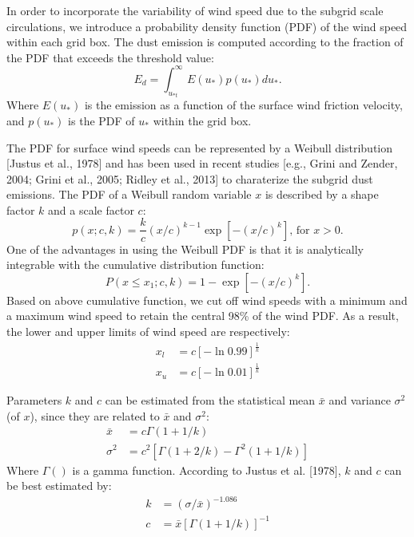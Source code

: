   In order to incorporate the variability of wind speed due to the subgrid scale
  circulations, we introduce a probability density function (PDF) of the wind speed
  within each grid box. The dust emission is computed according to the fraction of 
  the PDF that exceeds the threshold value:
  \begin{equation}
  E_{d} = \int^\infty_{u_{*t}} E(u_*) p(u_*) d u_* \mbox{.}
  \end{equation}
  Where $E(u_*)$ is the emission as a function of the surface wind friction velocity,
  and $p(u_*)$ is the PDF of $u_*$ within the grid box. 

  The PDF for surface wind speeds can be represented by a Weibull distribution 
  [Justus et al., 1978] and has been used in recent studies [e.g., Grini and Zender,
  2004; Grini et al., 2005; Ridley et al., 2013] to charaterize the subgrid dust 
  emissions. The PDF of a Weibull random variable $x$ is described by a shape factor $k$ 
  and a scale factor $c$:
  \begin{equation}
  p(x;c,k) = \frac{k}{c} (x/c )^{k-1}
         \exp{\left[ -(x/c)^k \right]} \mbox{,  for } x>0 \mbox{.} 
  \end{equation}
  One of the advantages in using the Weibull PDF is that it is analytically 
  integrable with the cumulative distribution function:
  \begin{equation}
  P(x \leq x_1;c,k) = 1 - \exp{ \left[ -(x/c)^k\right] } \mbox{.}
  \end{equation} 
  Based on above cumulative function, we cut off wind speeds with a minimum and a 
  maximum wind speed to retain the central 98\% of the wind PDF. As a result, the 
  lower and upper limits of wind speed are respectively:
  \begin{align} 
  x_{l} &= c \left[ -\ln{0.99} \right]^{\frac{1}{k}}  \\
  x_{u} &= c \left[ -\ln{0.01} \right]^{\frac{1}{k}} \label{eq:xu}
  \end{align}

  Parameters $k$ and $c$ can be estimated from the statistical mean $\bar{x}$ and 
  variance $\sigma^2$ (of $x$), since they are related to $\bar{x}$ and $\sigma^2$: 
  \begin{align}
  \bar{x}  &= c \Gamma(1+1/k)  \\
  \sigma^2 &= c^2 \left[ \Gamma(1+2/k) - \Gamma^2(1+1/k) \right]  
  \end{align}
  Where $\Gamma()$ is a gamma function. According to Justus et al. [1978], $k$ and $c$ 
  can be best estimated by:
  \begin{align}
  k &= (\sigma/\bar{x})^{-1.086} \\
  c &= \bar{x} \left[ \Gamma(1+1/k) \right]^{-1}
  \end{align}
  
